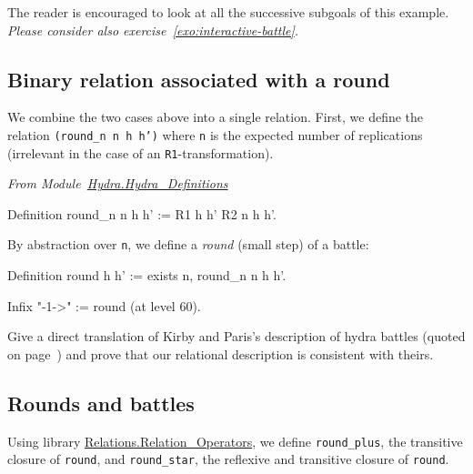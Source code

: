 The reader is encouraged to look at all the successive subgoals of this example.
\emph{Please consider also exercise~\vref{exo:interactive-battle}.}


\subsection{Binary relation associated with a round}

We combine the two cases above into a single relation.
First,  we define the  relation \texttt{(round\_n n h h')} where \texttt{n} is the expected number of  replications (irrelevant in the case of an \texttt{R1}-transformation).

\vspace{4pt}
\emph{From Module~\href{../theories/html/hydras.Hydra.Hydra_Definitions.html\#round_n}{Hydra.Hydra\_Definitions}}

\begin{Coqsrc}
Definition round_n n h h' := R1 h h' \/ R2 n h h'.  
\end{Coqsrc}

By abstraction over \texttt{n}, we define a \emph{round} (small step) of a battle:

\label{sect:infix-round}
\begin{Coqsrc}
Definition round h h' := exists n,  round_n n h h'.

Infix "-1->" := round (at level 60).
\end{Coqsrc}


\begin{project}
Give a direct translation of Kirby and Paris's description of hydra battles (quoted on page~\pageref{original-rules}) and prove that our relational description is consistent with theirs.
\end{project}


\subsection{Rounds and battles}


Using library \href{https://coq.inria.fr/distrib/current/stdlib/Coq.Relations.Relation_Operators.html}{Relations.Relation\_Operators}, we define \texttt{round\_plus},  the transitive closure of \texttt{round}, and \texttt{round\_star},  the reflexive and transitive closure of \texttt{round}.

